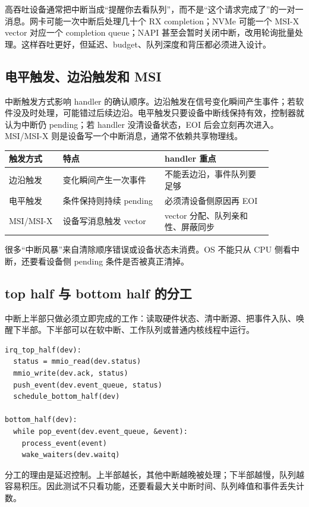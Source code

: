 高吞吐设备通常把中断当成“提醒你去看队列”，而不是“这个请求完成了”的一对一消息。网卡可能一次中断后处理几十个 RX completion；NVMe 可能一个 MSI-X vector 对应一个 completion queue；NAPI 甚至会暂时关闭中断，改用轮询批量处理。这样吞吐更好，但延迟、budget、队列深度和背压都必须进入设计。

\subsection{电平触发、边沿触发和 MSI}

中断触发方式影响 handler 的确认顺序。边沿触发在信号变化瞬间产生事件；若软件没及时处理，可能错过后续边沿。电平触发只要设备中断线保持有效，控制器就认为中断仍 pending；若 handler 没清设备状态，EOI 后会立刻再次进入。MSI/MSI-X 则是设备写一个中断消息，通常不依赖共享物理线。

\begin{longtable}{p{0.18\linewidth}p{0.34\linewidth}p{0.36\linewidth}}
\toprule
触发方式 & 特点 & handler 重点 \\
\midrule
边沿触发 & 变化瞬间产生一次事件 & 不能丢边沿，事件队列要足够 \\
电平触发 & 条件保持则持续 pending & 必须清设备侧原因再 EOI \\
MSI/MSI-X & 设备写消息触发 vector & vector 分配、队列亲和性、屏蔽同步 \\
\bottomrule
\end{longtable}

很多“中断风暴”来自清除顺序错误或设备状态未消费。OS 不能只从 CPU 侧看中断，还要看设备侧 pending 条件是否被真正清掉。

\subsection{top half 与 bottom half 的分工}

中断上半部只做必须立即完成的工作：读取硬件状态、清中断源、把事件入队、唤醒下半部。下半部可以在软中断、工作队列或普通内核线程中运行。

\begin{lstlisting}
irq_top_half(dev):
  status = mmio_read(dev.status)
  mmio_write(dev.ack, status)
  push_event(dev.event_queue, status)
  schedule_bottom_half(dev)

bottom_half(dev):
  while pop_event(dev.event_queue, &event):
    process_event(event)
    wake_waiters(dev.waitq)
\end{lstlisting}

分工的理由是延迟控制。上半部越长，其他中断越晚被处理；下半部越慢，队列越容易积压。因此测试不只看功能，还要看最大关中断时间、队列峰值和事件丢失计数。

